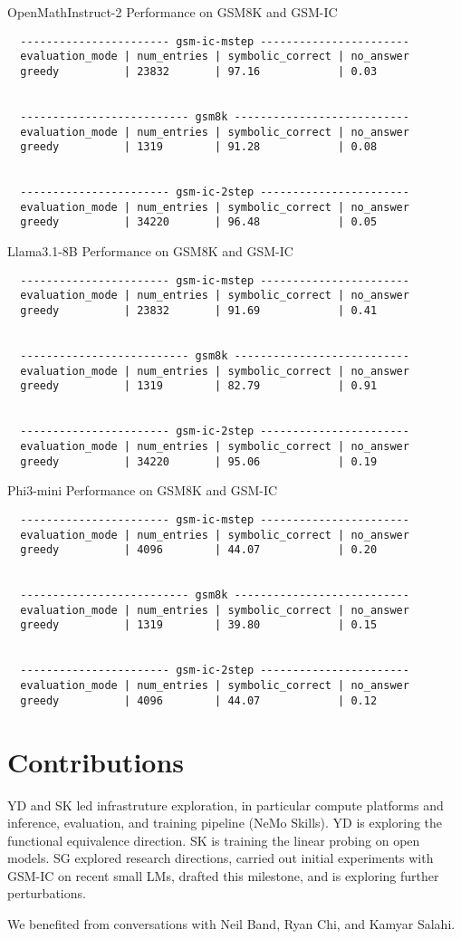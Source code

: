 \documentclass{article}
\begin{document}
OpenMathInstruct-2 Performance on GSM8K and GSM-IC
\begin{verbatim}
  ----------------------- gsm-ic-mstep -----------------------
  evaluation_mode | num_entries | symbolic_correct | no_answer
  greedy          | 23832       | 97.16            | 0.03     


  -------------------------- gsm8k ---------------------------
  evaluation_mode | num_entries | symbolic_correct | no_answer
  greedy          | 1319        | 91.28            | 0.08     


  ----------------------- gsm-ic-2step -----------------------
  evaluation_mode | num_entries | symbolic_correct | no_answer
  greedy          | 34220       | 96.48            | 0.05  \end{verbatim}

Llama3.1-8B Performance on GSM8K and GSM-IC
\begin{verbatim}
  ----------------------- gsm-ic-mstep -----------------------
  evaluation_mode | num_entries | symbolic_correct | no_answer
  greedy          | 23832       | 91.69            | 0.41     


  -------------------------- gsm8k ---------------------------
  evaluation_mode | num_entries | symbolic_correct | no_answer
  greedy          | 1319        | 82.79            | 0.91     


  ----------------------- gsm-ic-2step -----------------------
  evaluation_mode | num_entries | symbolic_correct | no_answer
  greedy          | 34220       | 95.06            | 0.19  \end{verbatim}

Phi3-mini Performance on GSM8K and GSM-IC
\begin{verbatim}
  ----------------------- gsm-ic-mstep -----------------------
  evaluation_mode | num_entries | symbolic_correct | no_answer
  greedy          | 4096        | 44.07            | 0.20     
  
  
  -------------------------- gsm8k ---------------------------
  evaluation_mode | num_entries | symbolic_correct | no_answer
  greedy          | 1319        | 39.80            | 0.15     
  
  
  ----------------------- gsm-ic-2step -----------------------
  evaluation_mode | num_entries | symbolic_correct | no_answer
  greedy          | 4096        | 44.07            | 0.12   \end{verbatim}


\section{Contributions}
YD and SK led infrastruture exploration, in particular compute platforms and inference, evaluation, and training pipeline (NeMo Skills). YD is exploring the functional equivalence direction. SK is training the linear probing on open models. SG explored research directions, carried out initial experiments with GSM-IC on recent small LMs, drafted this milestone, and is exploring further perturbations.

We benefited from conversations with Neil Band, Ryan Chi, and Kamyar Salahi.


%

\end{document}
